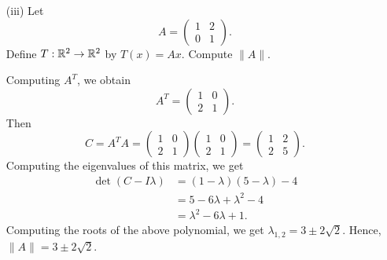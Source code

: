 \documentclass[a4paper]{article}
\begin{document}
\begin{enumerate}
\begin{enumerate}
\begin{proof}
            \end{proof}
        \end{enumerate}
    \item[(iii)] Let 
        \[  A = \begin{pmatrix} 1 & 2 \\ 0 & 1  \end{pmatrix}.  \]
        Define \( T: \mathbb{R}^{2} \to \mathbb{R}^{2} \) by \( T(x) = Ax  \). Compute \( \|A\| \).
        \begin{solution}
            Computing \( A^{T} \), we obtain
            \[  A^{T} = \begin{pmatrix} 1 & 0 \\ 2 & 1  \end{pmatrix}.  \]
            Then 
            \[ C =  A^{T}A = \begin{pmatrix} 1 & 0  \\ 2 & 1  \end{pmatrix} \begin{pmatrix} 1 & 0 \\ 2 & 1  \end{pmatrix} = \begin{pmatrix} 1 & 2 \\ 2 & 5  \end{pmatrix}. \]
            Computing the eigenvalues of this matrix, we get 
            \begin{align*}
                \det(C - I \lambda) &= (1-\lambda)(5-\lambda) - 4   \\
                                    &= 5- 6 \lambda + \lambda^{2} - 4 \\
                                    &= \lambda^{2} - 6 \lambda +1.
        \end{align*}
        Computing the roots of the above polynomial, we get \( \lambda_{1,2} = 3 \pm 2 \sqrt{ 2 }  \). Hence, \( \|A\| = 3 \pm 2 \sqrt{ 2 }  \).
        \end{solution}
\end{enumerate}
\end{document}
